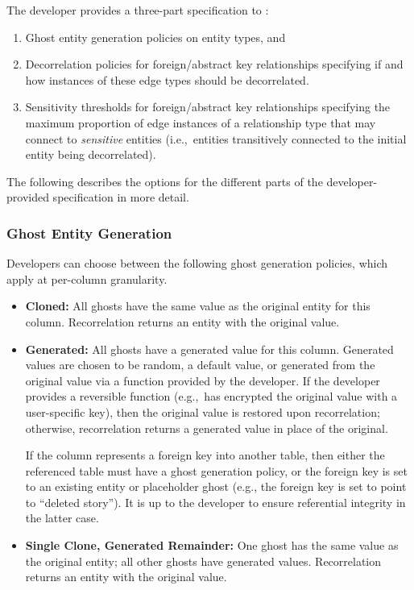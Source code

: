 The developer provides a three-part specification to \sys{}: 
\begin{enumerate}
    \item Ghost entity generation policies on entity types, and
    \item Decorrelation policies for foreign/abstract key relationships specifying if and how
        instances of these edge types should be decorrelated.
    \item Sensitivity thresholds for foreign/abstract key relationships specifying the maximum
        proportion of edge instances of a relationship type that may connect to \emph{sensitive} entities (i.e.,\ entities transitively connected to the initial entity being
        decorrelated). 
\end{enumerate}

\noindent The following describes the options for the different parts of the developer-provided
specification in more detail.

\subsubsection{Ghost Entity Generation}
Developers can choose between the following ghost generation policies, which apply at 
per-column granularity.
\begin{itemize}
    \item \textbf{Cloned:} All ghosts have the same value as the original entity for this column.
        Recorrelation returns an entity with the original value.

    \item \textbf{Generated:} All ghosts have a generated value for this column. Generated values are
chosen to be random, a default value, or generated from the original value via a function provided by the developer.
        If the developer provides a reversible function (e.g.,\ has encrypted the original value
        with a user-specific key), then the original value is restored upon
        recorrelation; otherwise, recorrelation returns a generated value in place of the original.

        If the column represents a foreign key into another table, then either the referenced table must 
        have a ghost generation policy, or the foreign key is set to an existing entity or placeholder ghost (e.g.,
        the foreign key is set to point to ``deleted story''). It is up to the developer to ensure
        referential integrity in the latter case.

\item \textbf{Single Clone, Generated Remainder:} One ghost has the same value as the original
        entity; all other ghosts have generated values. Recorrelation returns an entity with the original value.
\end{itemize}


